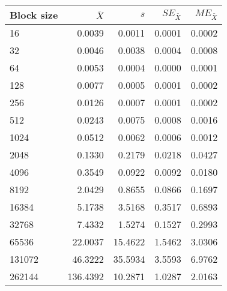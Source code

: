 \begin{tabular}{lrrrr}\toprule
{\small Block size} & $\bar{X}$ & $s$ & $SE_{\bar{X}}$ & $ME_{\bar{X}}$ \\\midrule
16 & 0.0039 & 0.0011 & 0.0001 & 0.0002\\
32 & 0.0046 & 0.0038 & 0.0004 & 0.0008\\
64 & 0.0053 & 0.0004 & 0.0000 & 0.0001\\
128 & 0.0077 & 0.0005 & 0.0001 & 0.0002\\
256 & 0.0126 & 0.0007 & 0.0001 & 0.0002\\
512 & 0.0243 & 0.0075 & 0.0008 & 0.0016\\
1024 & 0.0512 & 0.0062 & 0.0006 & 0.0012\\
2048 & 0.1330 & 0.2179 & 0.0218 & 0.0427\\
4096 & 0.3549 & 0.0922 & 0.0092 & 0.0180\\
8192 & 2.0429 & 0.8655 & 0.0866 & 0.1697\\
16384 & 5.1738 & 3.5168 & 0.3517 & 0.6893\\
32768 & 7.4332 & 1.5274 & 0.1527 & 0.2993\\
65536 & 22.0037 & 15.4622 & 1.5462 & 3.0306\\
131072 & 46.3222 & 35.5934 & 3.5593 & 6.9762\\
262144 & 136.4392 & 10.2871 & 1.0287 & 2.0163\\
\bottomrule
\end{tabular}
